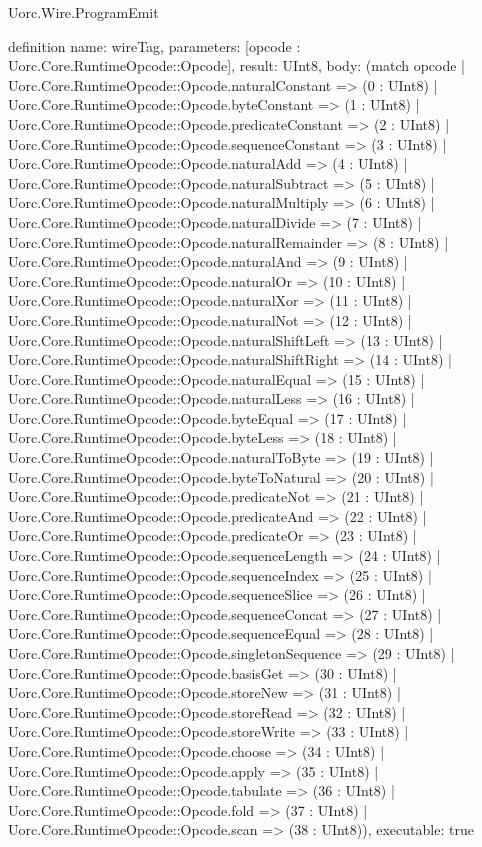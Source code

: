 \begin{lexlean}{Uorc.Wire.ProgramEmit}
\begin{semanticmodule}
definition{
  name: wireTag,
  parameters: [opcode : Uorc.Core.RuntimeOpcode::Opcode],
  result: UInt8,
  body: (match opcode
    | Uorc.Core.RuntimeOpcode::Opcode.naturalConstant => (0 : UInt8)
    | Uorc.Core.RuntimeOpcode::Opcode.byteConstant => (1 : UInt8)
    | Uorc.Core.RuntimeOpcode::Opcode.predicateConstant => (2 : UInt8)
    | Uorc.Core.RuntimeOpcode::Opcode.sequenceConstant => (3 : UInt8)
    | Uorc.Core.RuntimeOpcode::Opcode.naturalAdd => (4 : UInt8)
    | Uorc.Core.RuntimeOpcode::Opcode.naturalSubtract => (5 : UInt8)
    | Uorc.Core.RuntimeOpcode::Opcode.naturalMultiply => (6 : UInt8)
    | Uorc.Core.RuntimeOpcode::Opcode.naturalDivide => (7 : UInt8)
    | Uorc.Core.RuntimeOpcode::Opcode.naturalRemainder => (8 : UInt8)
    | Uorc.Core.RuntimeOpcode::Opcode.naturalAnd => (9 : UInt8)
    | Uorc.Core.RuntimeOpcode::Opcode.naturalOr => (10 : UInt8)
    | Uorc.Core.RuntimeOpcode::Opcode.naturalXor => (11 : UInt8)
    | Uorc.Core.RuntimeOpcode::Opcode.naturalNot => (12 : UInt8)
    | Uorc.Core.RuntimeOpcode::Opcode.naturalShiftLeft => (13 : UInt8)
    | Uorc.Core.RuntimeOpcode::Opcode.naturalShiftRight => (14 : UInt8)
    | Uorc.Core.RuntimeOpcode::Opcode.naturalEqual => (15 : UInt8)
    | Uorc.Core.RuntimeOpcode::Opcode.naturalLess => (16 : UInt8)
    | Uorc.Core.RuntimeOpcode::Opcode.byteEqual => (17 : UInt8)
    | Uorc.Core.RuntimeOpcode::Opcode.byteLess => (18 : UInt8)
    | Uorc.Core.RuntimeOpcode::Opcode.naturalToByte => (19 : UInt8)
    | Uorc.Core.RuntimeOpcode::Opcode.byteToNatural => (20 : UInt8)
    | Uorc.Core.RuntimeOpcode::Opcode.predicateNot => (21 : UInt8)
    | Uorc.Core.RuntimeOpcode::Opcode.predicateAnd => (22 : UInt8)
    | Uorc.Core.RuntimeOpcode::Opcode.predicateOr => (23 : UInt8)
    | Uorc.Core.RuntimeOpcode::Opcode.sequenceLength => (24 : UInt8)
    | Uorc.Core.RuntimeOpcode::Opcode.sequenceIndex => (25 : UInt8)
    | Uorc.Core.RuntimeOpcode::Opcode.sequenceSlice => (26 : UInt8)
    | Uorc.Core.RuntimeOpcode::Opcode.sequenceConcat => (27 : UInt8)
    | Uorc.Core.RuntimeOpcode::Opcode.sequenceEqual => (28 : UInt8)
    | Uorc.Core.RuntimeOpcode::Opcode.singletonSequence => (29 : UInt8)
    | Uorc.Core.RuntimeOpcode::Opcode.basisGet => (30 : UInt8)
    | Uorc.Core.RuntimeOpcode::Opcode.storeNew => (31 : UInt8)
    | Uorc.Core.RuntimeOpcode::Opcode.storeRead => (32 : UInt8)
    | Uorc.Core.RuntimeOpcode::Opcode.storeWrite => (33 : UInt8)
    | Uorc.Core.RuntimeOpcode::Opcode.choose => (34 : UInt8)
    | Uorc.Core.RuntimeOpcode::Opcode.apply => (35 : UInt8)
    | Uorc.Core.RuntimeOpcode::Opcode.tabulate => (36 : UInt8)
    | Uorc.Core.RuntimeOpcode::Opcode.fold => (37 : UInt8)
    | Uorc.Core.RuntimeOpcode::Opcode.scan => (38 : UInt8)),
  executable: true
}


\end{semanticmodule}
\end{lexlean}
